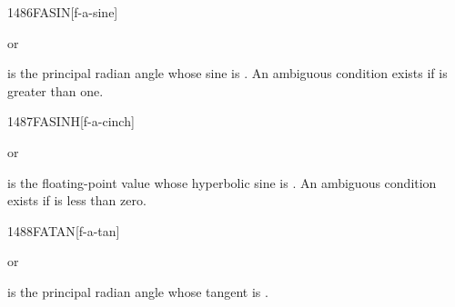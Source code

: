 \begin{worddef}{1486}{FASIN}[f-a-sine]
\item {} or

	 is the principal radian angle whose sine is .
	An ambiguous condition exists if  is greater than one.
\end{worddef}


\begin{worddef}{1487}{FASINH}[f-a-cinch]
\item {} or

	 is the floating-point value whose hyperbolic sine is
	. An ambiguous condition exists if  is less
	than zero.
\end{worddef}


\begin{worddef}{1488}{FATAN}[f-a-tan]
\item {} or

	 is the principal radian angle whose tangent is .
\end{worddef}


